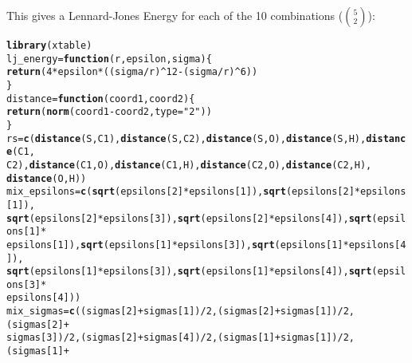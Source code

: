 \documentclass{article}\usepackage[]{graphicx}\usepackage[]{color}
\makeatletter
\newcommand{\hlnum}[1]{\textcolor[rgb]{0.686,0.059,0.569}{#1}}%
\newcommand{\hlstr}[1]{\textcolor[rgb]{0.192,0.494,0.8}{#1}}%
\newcommand{\hlopt}[1]{\textcolor[rgb]{0,0,0}{#1}}%
\newcommand{\hlstd}[1]{\textcolor[rgb]{0.345,0.345,0.345}{#1}}%
\newcommand{\hlkwa}[1]{\textcolor[rgb]{0.161,0.373,0.58}{\textbf{#1}}}%
\newcommand{\hlkwb}[1]{\textcolor[rgb]{0.69,0.353,0.396}{#1}}%
\newcommand{\hlkwc}[1]{\textcolor[rgb]{0.333,0.667,0.333}{#1}}%
\newcommand{\hlkwd}[1]{\textcolor[rgb]{0.737,0.353,0.396}{\textbf{#1}}}%
\newenvironment{kframe}{%
 \def\at@end@of@kframe{}%
 \ifinner\ifhmode%
  \def\at@end@of@kframe{\end{minipage}}%
  \begin{minipage}{\columnwidth}%
 \fi\fi%
 \def\FrameCommand##1{\hskip\@totalleftmargin \hskip-\fboxsep
 \colorbox{shadecolor}{##1}\hskip-\fboxsep
     \hskip-\linewidth \hskip-\@totalleftmargin \hskip\columnwidth}%
 \MakeFramed {\advance\hsize-\width
   \@totalleftmargin\z@ \linewidth\hsize
   \@setminipage}}%
 {\par\unskip\endMakeFramed%
 \at@end@of@kframe}
\makeatother
\begin{document}
This gives a Lennard-Jones Energy for each of the 10 combinations (${5}\choose{2}$):

\begin{kframe}
\begin{alltt}
\hlkwd{library}\hlstd{(xtable)}
\hlstd{lj_energy} \hlkwb{=} \hlkwa{function}\hlstd{(}\hlkwc{r}\hlstd{,} \hlkwc{epsilon}\hlstd{,} \hlkwc{sigma}\hlstd{) \{}
    \hlkwd{return}\hlstd{(}\hlnum{4} \hlopt{*} \hlstd{epsilon} \hlopt{*} \hlstd{((sigma}\hlopt{/}\hlstd{r)}\hlopt{^}\hlnum{12} \hlopt{-} \hlstd{(sigma}\hlopt{/}\hlstd{r)}\hlopt{^}\hlnum{6}\hlstd{))}
\hlstd{\}}
\hlstd{distance} \hlkwb{=} \hlkwa{function}\hlstd{(}\hlkwc{coord1}\hlstd{,} \hlkwc{coord2}\hlstd{) \{}
    \hlkwd{return}\hlstd{(}\hlkwd{norm}\hlstd{(coord1} \hlopt{-} \hlstd{coord2,} \hlkwc{type} \hlstd{=} \hlstr{"2"}\hlstd{))}
\hlstd{\}}
\hlstd{rs} \hlkwb{=} \hlkwd{c}\hlstd{(}\hlkwd{distance}\hlstd{(S, C1),} \hlkwd{distance}\hlstd{(S, C2),} \hlkwd{distance}\hlstd{(S, O),} \hlkwd{distance}\hlstd{(S, H),} \hlkwd{distance}\hlstd{(C1,}
    \hlstd{C2),} \hlkwd{distance}\hlstd{(C1, O),} \hlkwd{distance}\hlstd{(C1, H),} \hlkwd{distance}\hlstd{(C2, O),} \hlkwd{distance}\hlstd{(C2, H),}
    \hlkwd{distance}\hlstd{(O, H))}
\hlstd{mix_epsilons} \hlkwb{=} \hlkwd{c}\hlstd{(}\hlkwd{sqrt}\hlstd{(epsilons[}\hlnum{2}\hlstd{]} \hlopt{*} \hlstd{epsilons[}\hlnum{1}\hlstd{]),} \hlkwd{sqrt}\hlstd{(epsilons[}\hlnum{2}\hlstd{]} \hlopt{*} \hlstd{epsilons[}\hlnum{1}\hlstd{]),}
    \hlkwd{sqrt}\hlstd{(epsilons[}\hlnum{2}\hlstd{]} \hlopt{*} \hlstd{epsilons[}\hlnum{3}\hlstd{]),} \hlkwd{sqrt}\hlstd{(epsilons[}\hlnum{2}\hlstd{]} \hlopt{*} \hlstd{epsilons[}\hlnum{4}\hlstd{]),} \hlkwd{sqrt}\hlstd{(epsilons[}\hlnum{1}\hlstd{]} \hlopt{*}
        \hlstd{epsilons[}\hlnum{1}\hlstd{]),} \hlkwd{sqrt}\hlstd{(epsilons[}\hlnum{1}\hlstd{]} \hlopt{*} \hlstd{epsilons[}\hlnum{3}\hlstd{]),} \hlkwd{sqrt}\hlstd{(epsilons[}\hlnum{1}\hlstd{]} \hlopt{*} \hlstd{epsilons[}\hlnum{4}\hlstd{]),}
    \hlkwd{sqrt}\hlstd{(epsilons[}\hlnum{1}\hlstd{]} \hlopt{*} \hlstd{epsilons[}\hlnum{3}\hlstd{]),} \hlkwd{sqrt}\hlstd{(epsilons[}\hlnum{1}\hlstd{]} \hlopt{*} \hlstd{epsilons[}\hlnum{4}\hlstd{]),} \hlkwd{sqrt}\hlstd{(epsilons[}\hlnum{3}\hlstd{]} \hlopt{*}
        \hlstd{epsilons[}\hlnum{4}\hlstd{]))}
\hlstd{mix_sigmas} \hlkwb{=} \hlkwd{c}\hlstd{((sigmas[}\hlnum{2}\hlstd{]} \hlopt{+} \hlstd{sigmas[}\hlnum{1}\hlstd{])}\hlopt{/}\hlnum{2}\hlstd{, (sigmas[}\hlnum{2}\hlstd{]} \hlopt{+} \hlstd{sigmas[}\hlnum{1}\hlstd{])}\hlopt{/}\hlnum{2}\hlstd{, (sigmas[}\hlnum{2}\hlstd{]} \hlopt{+}
    \hlstd{sigmas[}\hlnum{3}\hlstd{])}\hlopt{/}\hlnum{2}\hlstd{, (sigmas[}\hlnum{2}\hlstd{]} \hlopt{+} \hlstd{sigmas[}\hlnum{4}\hlstd{])}\hlopt{/}\hlnum{2}\hlstd{, (sigmas[}\hlnum{1}\hlstd{]} \hlopt{+} \hlstd{sigmas[}\hlnum{1}\hlstd{])}\hlopt{/}\hlnum{2}\hlstd{, (sigmas[}\hlnum{1}\hlstd{]} \hlopt{+}

\end{alltt}
\end{kframe}
\end{document}
